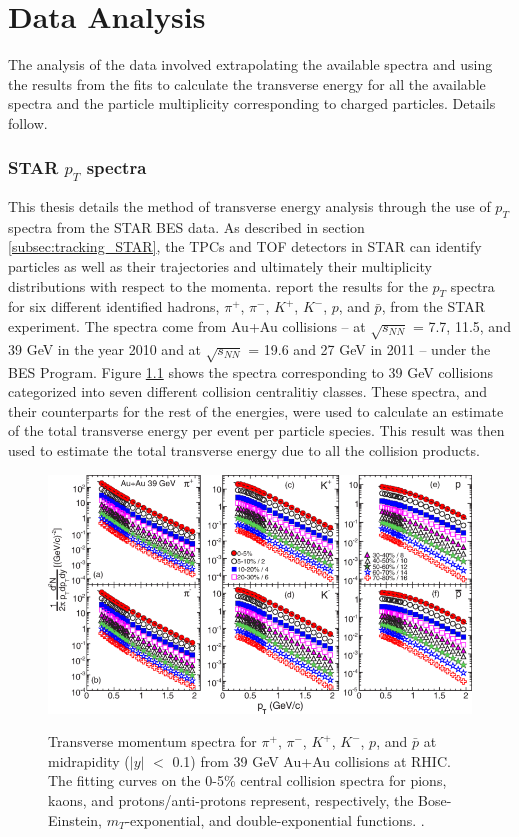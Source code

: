 \chapter{Data Analysis} \label{ch:analysis}
The analysis of the data involved extrapolating the available spectra and using the results from the fits to calculate the transverse energy for all the available spectra and the particle multiplicity corresponding to charged particles. Details follow.

\subsection{STAR $p_{T}$ spectra}
This thesis details the method of transverse energy analysis through the use of $p_{T}$ spectra from the STAR BES data. As described in section \ref{subsec:tracking_STAR}, the TPCs and TOF detectors in STAR can identify particles as well as their trajectories and ultimately their multiplicity distributions with respect to the momenta. \citet{PhysRevC.96.044904} report the results for the $p_{T}$ spectra for six different identified hadrons, $\pi^+$, $\pi^-$, $K^+$, $K^-$, $p$, and $\bar{p}$, from the STAR experiment. The spectra come from Au+Au collisions -- at $\sqrt{s_{NN}}$ = 7.7, 11.5, and 39 GeV in the year 2010 and at $\sqrt{s_{NN}}$ = 19.6 and 27 GeV in 2011 -- under the BES Program. Figure \ref{fig:BESPaper_pTSpectra} \cite{PhysRevC.96.044904} shows the spectra corresponding to 39 GeV collisions categorized into seven different collision centralitiy classes. These spectra, and their counterparts for the rest of the energies, were used to calculate an estimate of the total transverse energy per event per particle species. This result was then used to estimate the total transverse energy due to all the collision products.
\begin{figure}[h]
  \centering
  \includegraphics[width=6.5in]{../figures/PhysRevC-96-044904_pTSpectra_39.png}\\
  \caption{Transverse momentum spectra for $\pi^{+}$, $\pi^{-}$, $K^+$, $K^{-}$, $p$, and $\bar{p}$ at midrapidity ($|y|$ $<$ 0.1) from 39 GeV Au+Au collisions at RHIC. The fitting curves on the 0-5\% central collision spectra for pions, kaons, and protons/anti-protons represent, respectively, the Bose-Einstein, $m_{T}$-exponential, and double-exponential functions. \cite{PhysRevC.96.044904}.}\label{fig:BESPaper_pTSpectra}
\end{figure}


